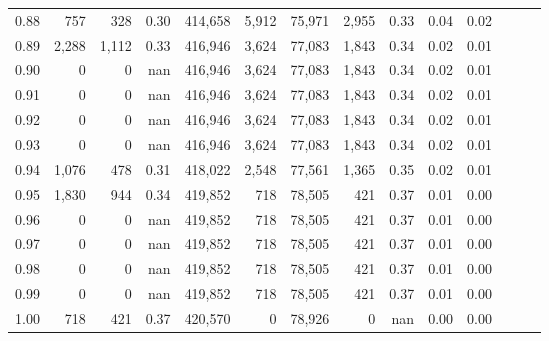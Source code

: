 \begin{tabular}{rrrrrrrrrrrrrr}
0.88 &     757 &    328 &  0.30 &  414,658 &    5,912 &  75,971 &   2,955 &  0.33 &  0.04 &      0.02 \\
0.89 &   2,288 &  1,112 &  0.33 &  416,946 &    3,624 &  77,083 &   1,843 &  0.34 &  0.02 &      0.01 \\
0.90 &       0 &      0 &   nan &  416,946 &    3,624 &  77,083 &   1,843 &  0.34 &  0.02 &      0.01 \\
0.91 &       0 &      0 &   nan &  416,946 &    3,624 &  77,083 &   1,843 &  0.34 &  0.02 &      0.01 \\
0.92 &       0 &      0 &   nan &  416,946 &    3,624 &  77,083 &   1,843 &  0.34 &  0.02 &      0.01 \\
0.93 &       0 &      0 &   nan &  416,946 &    3,624 &  77,083 &   1,843 &  0.34 &  0.02 &      0.01 \\
0.94 &   1,076 &    478 &  0.31 &  418,022 &    2,548 &  77,561 &   1,365 &  0.35 &  0.02 &      0.01 \\
0.95 &   1,830 &    944 &  0.34 &  419,852 &      718 &  78,505 &     421 &  0.37 &  0.01 &      0.00 \\
0.96 &       0 &      0 &   nan &  419,852 &      718 &  78,505 &     421 &  0.37 &  0.01 &      0.00 \\
0.97 &       0 &      0 &   nan &  419,852 &      718 &  78,505 &     421 &  0.37 &  0.01 &      0.00 \\
0.98 &       0 &      0 &   nan &  419,852 &      718 &  78,505 &     421 &  0.37 &  0.01 &      0.00 \\
0.99 &       0 &      0 &   nan &  419,852 &      718 &  78,505 &     421 &  0.37 &  0.01 &      0.00 \\
1.00 &     718 &    421 &  0.37 &  420,570 &        0 &  78,926 &       0 &   nan &  0.00 &      0.00 \\
\bottomrule
\end{tabular}
